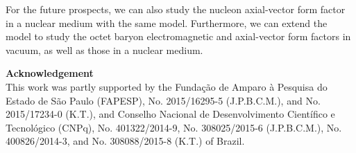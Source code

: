 \documentclass[preprint,aps,showpacs,floatfix]{revtex4}
\begin{document}
For the future prospects, we can also study the  
nucleon axial-vector form factor in a nuclear medium with 
the same model.
Furthermore, we can extend the model to study 
the octet baryon electromagnetic and axial-vector 
form factors in vacuum, as well as those in a nuclear medium. 
\vspace{2ex}


\noindent
{\bf Acknowledgement}\\
This work was partly supported by the Funda\c c\~ao de Amparo \`a Pesquisa do Estado de
S\~ao Paulo (FAPESP), No. 2015/16295-5 (J.P.B.C.M.), and No. 2015/17234-0 (K.T.), 
and Conselho Nacional de Desenvolvimento 
Cient\'ifico e Tecnol\'ogico (CNPq), No. 401322/2014-9, No. 308025/2015-6 (J.P.B.C.M.), 
No. 400826/2014-3, and No. 308088/2015-8 (K.T.) of Brazil.
\end{document}
